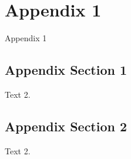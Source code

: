 \chapter{Appendix 1}{Appendix 1}
\label{App:Appendix1}
\renewcommand{\thesection}{A.\arabic{section}}

\section{Appendix Section 1} 
Text 2.

\section{Appendix Section 2}
Text 2.